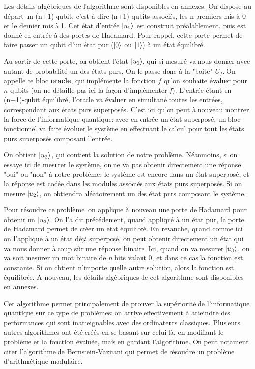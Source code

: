 Les détails algébriques de l'algorithme sont disponibles en annexes.
\medbreak
On dispose au départ un (n+1)-qubit, c'est à dire (n+1) qubits associés, les n premiers mis à 0 et le dernier mis à 1. Cet état d'entrée $\ket{u_0}$ est construit préalablement, puis est donné en entrée à des portes de Hadamard. Pour rappel, cette porte permet de faire passer un qubit d'un état pur ($\ket{0}$ ou $\ket{1}$) à un état équilibré. 

Au sortir de cette porte, on obtient l'état $\ket{u_1}$, qui si mesuré va nous donner avec autant de probabilité un des états purs. On le passe donc à la "boite" $U_f$. On appelle ce bloc \textbf{oracle}, qui implémente la fonction $f$ qu'on souhaite évaluer pour $n$ qubits (on ne détaille pas ici la façon d'implémenter $f$). L'entrée étant un (n+1)-qubit équilibré, l'oracle va évaluer en simultané toutes les entrées, correspondant aux états purs superposés. C'est ici qu'on peut à nouveau montrer la force de l'informatique quantique: avec en entrée un état superposé, un bloc fonctionnel va faire évoluer le système en effectuant le calcul pour tout les états purs superposés composant l'entrée.

On obtient $\ket{u_2}$, qui contient la solution de notre problème. Néanmoins, si on essaye ici de mesurer le système, on ne va pas obtenir directement une réponse "oui" ou "non" à notre problème: le système est encore dans un état superposé, et la réponse est codée dans les modules associés aux états purs superposés. Si on mesure $\ket{u_2}$, on obtiendra aléatoirement un des état purs composant le système.

Pour résoudre ce problème, on applique à nouveau une porte de Hadamard pour obtenir un $\ket{u_3}$. On l'a dit précédement, quand appliqué à un état pur, la porte de Hadamard permet de créer un état équilibré. En revanche, quand comme ici on l'applique à un état déjà superposé, on peut obtenir directement un état qui va nous donner à coup sûr une réponse binaire. Ici, quand on va mesurer $\ket{u_3}$, on va soit mesurer un mot binaire de $n$ bits valant 0, et dans ce cas la fonction est constante. Si on obtient n'importe quelle autre solution, alors la fonction est équilibrée. A nouveau, les détails algébriques de cet algorithme sont disponibles en annexes.

\medbreak

Cet algorithme permet principalement de prouver la supériorité de l'informatique quantique sur ce type de problèmes: on arrive effectivement à atteindre des performances qui sont inatteignables avec des ordinateurs classiques. Plusieurs autres algorithmes ont été créés en se basant sur celui-là, en modifiant le problème et la fonction évaluée, mais en gardant l'algorithme. On peut notament citer l'algorithme de Bernstein-Vazirani \cite{Bernstein97} qui permet de résoudre un problème d'arithmétique modulaire.

